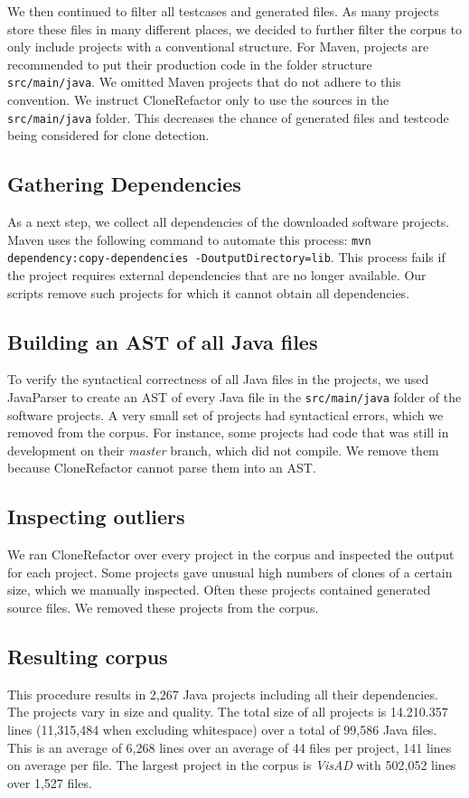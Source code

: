 We then continued to filter all testcases and generated files. As many projects store these files in many different places, we decided to further filter the corpus to only include projects with a conventional structure. For Maven, projects are recommended to put their production code in the folder structure \texttt{src/main/java}. We omitted Maven projects that do not adhere to this convention. We instruct CloneRefactor only to use the sources in the \texttt{src/main/java} folder. This decreases the chance of generated files and testcode being considered for clone detection.

\subsection{Gathering Dependencies}
As a next step, we collect all dependencies of the downloaded software projects. Maven uses the following command to automate this process: \texttt{mvn dependency:copy-dependencies -DoutputDirectory=lib}. This process fails if the project requires external dependencies that are no longer available. Our scripts remove such projects for which it cannot obtain all dependencies.

\subsection{Building an AST of all Java files}
To verify the syntactical correctness of all Java files in the projects, we used JavaParser \cite{tomassetti2017javaparser} to create an AST of every Java file in the \texttt{src/main/java} folder of the software projects. A very small set of projects had syntactical errors, which we removed from the corpus. For instance, some projects had code that was still in development on their \textit{master} branch, which did not compile. We remove them because CloneRefactor cannot parse them into an AST.

\subsection{Inspecting outliers}
We ran CloneRefactor over every project in the corpus and inspected the output for each project. Some projects gave unusual high numbers of clones of a certain size, which we manually inspected. Often these projects contained generated source files. We removed these projects from the corpus.

\subsection{Resulting corpus}
This procedure results in 2,267 Java projects including all their dependencies. The projects vary in size and quality. The total size of all projects is 14.210.357 lines (11,315,484 when excluding whitespace) over a total of 99,586 Java files. This is an average of 6,268 lines over an average of 44 files per project, 141 lines on average per file. The largest project in the corpus is \textit{VisAD} with 502,052 lines over 1,527 files.

